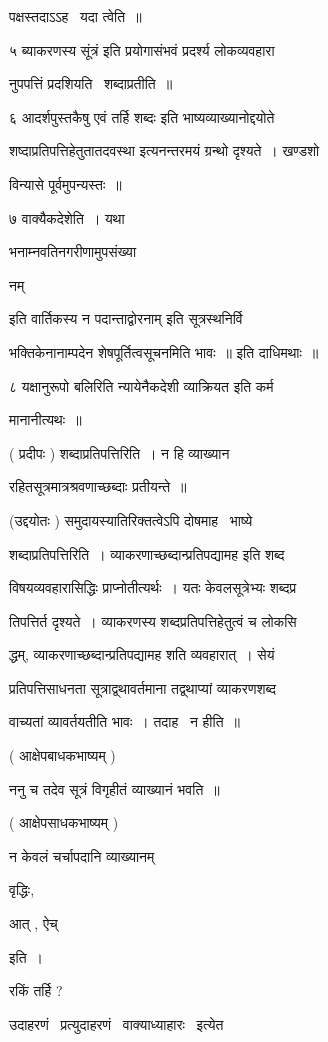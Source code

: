 \documentclass[11pt, openany]{book}
\begin{document}
पक्षस्तदाऽऽह \textendash\ यदा त्वेति~॥ 

५ ब्याकरणस्य सूंत्रं इति प्रयोगासंभवं प्रदर्श्य लोकव्यवहारा \textendash\ 

नुपपत्तिं प्रदशियति \textendash\ शब्दाप्रतीति~॥ 

६ आदर्शपुस्तकैषु एवं तर्हि शब्दः इति भाष्यव्याख्यानोद्दयोते 

{\qt शष्दाप्रतिपत्तिहेतुतातदवस्था} इत्यनन्तरमयं ग्रन्थो दृश्यते~। खण्डशो 

विन्यासे पूर्वमुपन्यस्तः~॥ 

७ वाक्यैकदेशेति~। यथा {\qt भनाम्नवतिनगरीणामुपसंख्या \textendash\ 

नम्} इति वार्तिकस्य {\qt न पदान्ताद्वोरनाम्} इति सूत्रस्थनिर्वि \textendash\ 

भक्तिकेनानाम्पदेन शेषपूर्तित्वसूचनमिति भावः~॥ इति दाधिमथाः~॥ 

८ यक्षानुरूपो बलिरिति न्यायेनैकदेशी व्याक्रियत इति कर्म \textendash\ 





मानानीत्यथः~॥ 

( प्रदीपः ) शब्दाप्रतिपत्तिरिति~। न हि व्याख्यान \textendash\ 

रहितसूत्रमात्रश्रवणाच्छब्दाः प्रतीयन्ते~॥ 

(उद्दयोतः ) समुदायस्यातिरिक्तत्वेऽपि दोषमाह \textendash\ भाष्ये \textendash\ 

शब्दाप्रतिपत्तिरिति~। व्याकरणाच्छब्दान्प्रतिपद्यामह इति शब्द \textendash\ 

विषयव्यवहारासिद्धिः प्राप्नोतीत्यर्थः~। यतः केवलसूत्रेभ्यः शब्दप्र \textendash\ 

तिपत्तिर्त दृश्यते~। व्याकरणस्य शब्दप्रतिपत्तिहेतुत्वं च लोकसि \textendash\ 

द्धम्, व्याकरणाच्छब्दान्प्रतिपद्यामह शति व्यवहारात्~। सेयं 

प्रतिपत्तिसाधनता सूत्राद्व्थावर्तमाना तद्व्थाप्यां व्याकरणशब्द \textendash\ 

वाच्यतां व्यावर्तयतीति भावः~। तदाह \textendash\ न हीति~॥ 

( आक्षेपबाधकभाष्यम् ) 

ननु च तदेव सूत्रं विगृहीतं व्याख्यानं भवति~॥ 

( आक्षेपसाधकभाष्यम् ) 

न केवलं चर्चापदानि व्याख्यानम् \textendash\ {\qt वृद्धिः, 

आत् , ऐच्} इति~। 

रकिं तर्हि ? 

उदाहरणं \textendash\ प्रत्युदाहरणं \textendash\ वाक्याध्याहारः \textendash\ इत्येत \textendash\ 
\end{document}
